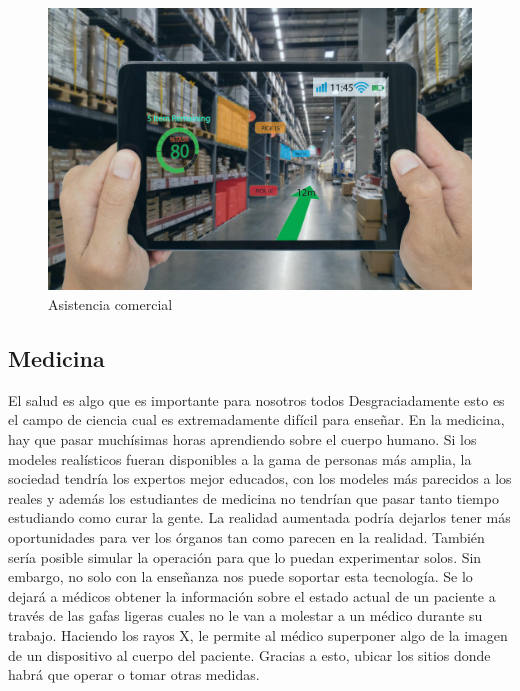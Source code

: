 \documentclass[a4paper,11pt]{scrartcl}
\begin{document}
\begin{figure}[h]
    \centering
    \includegraphics[width=0.7\linewidth]{businessassist}
    \caption{Asistencia comercial \cite{imgbusinessassist}}
\end{figure}

\subsection{Medicina}
El salud es algo que es importante para nosotros todos Desgraciadamente esto es el campo de ciencia cual es extremadamente difícil para enseñar. En la medicina, hay que pasar muchísimas horas aprendiendo sobre el cuerpo humano. Si los modeles realísticos fueran disponibles a la gama de personas más amplia, la sociedad tendría los expertos mejor educados, con los modeles más parecidos a los reales y además los estudiantes de medicina no tendrían que pasar tanto tiempo estudiando como curar la gente. La realidad aumentada podría dejarlos tener más oportunidades para ver los órganos tan como parecen en la realidad. También sería posible simular la operación para que lo puedan experimentar solos. Sin embargo, no solo con la enseñanza nos puede soportar esta tecnología. Se lo dejará a médicos obtener la información sobre el estado actual de un paciente a través de las gafas ligeras cuales no le van a molestar a un médico durante su trabajo. Haciendo los rayos X, le permite al médico superponer algo de la imagen de un dispositivo al cuerpo del paciente. Gracias a esto, ubicar los sitios donde habrá que operar o tomar otras medidas.
 
\end{document}
